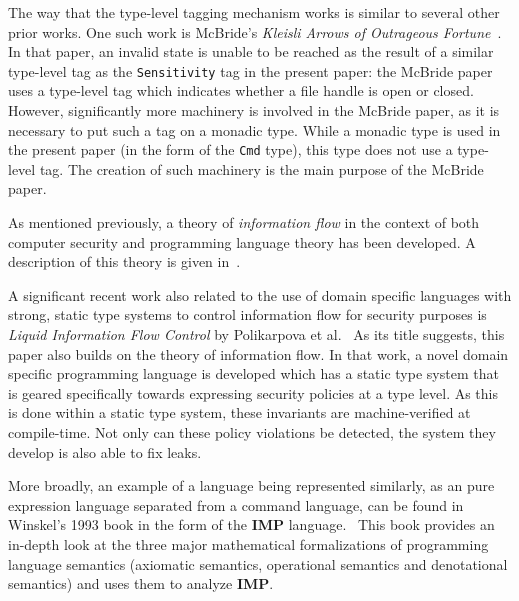 \documentclass[10pt, conference]{IEEEtran}
\newcommand{\ttt}{\texttt}
\begin{document}
The way that the type-level tagging mechanism works is similar to several other
prior works. One such work is McBride's \textit{Kleisli Arrows of Outrageous
Fortune}~\cite{KleisliArrows}. In that paper, an invalid state is unable to be
reached as the result of a similar type-level tag as the \ttt{Sensitivity} tag
in the present paper: the McBride paper uses a type-level tag which indicates
whether a file handle is open or closed. However, significantly more machinery
is involved in the McBride paper, as it is necessary to put such a tag on a
monadic type. While a monadic type is used in the present paper (in the form of
the \ttt{Cmd} type), this type does not use a type-level tag. The creation of
such machinery is the main purpose of the McBride paper.

As mentioned previously, a theory of \textit{information flow} in the context of
both computer security and programming language theory has been developed. A description
of this theory is given in~\cite{InfoFlowAnalysis}.

A significant recent work also related to the use of domain specific languages
with strong, static type systems to control information flow for security
purposes is \textit{Liquid Information Flow Control} by Polikarpova et
al.~\cite{Lifty} As its title suggests, this paper also builds on the theory of information flow. In that work, a novel domain specific programming language is
developed which has a static type system that is geared specifically towards
expressing security policies at a type level. As this is done within a static
type system, these invariants are machine-verified at compile-time.  Not only
can these policy violations be detected, the system they develop is also able to
fix leaks.

More broadly, an example of a language being represented similarly, as an
pure expression language separated from a command language, can be found in
Winskel's 1993 book in the form of the \textbf{IMP} language.~\cite{WinskelBook} This
book provides an in-depth look at the three major mathematical formalizations
of programming language semantics (axiomatic semantics, operational semantics and
denotational semantics) and uses them to analyze \textbf{IMP}.
\end{document}
